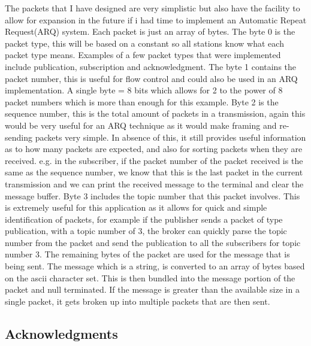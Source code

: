\documentclass{article}
\begin{document}
The packets that I have designed are very simplistic but also have the facility to allow for expansion in the future if i had time to implement an Automatic Repeat Request(ARQ) system.
Each packet is just an array of bytes. The byte 0 is the packet type, this will be based on a constant so all stations know what each packet type means. Examples of a few packet types that were implemented include publication, subscription and acknowledgment. 
\newline 
\newline
The byte 1 contains the packet number, this is useful for flow control and could also be used in an ARQ implementation. A single byte = 8 bits which allows for 2 to the power of 8 packet numbers which is more than enough for this example. 
\newline
\newline
Byte 2 is the sequence number, this is the total amount of packets in a transmission, again this would be very useful for an ARQ technique as it would make framing and re-sending packets very simple. In absence of this, it still provides useful information as to how many packets are expected, and also for sorting packets when they are received. e.g. in the subscriber, if the packet number of the packet received is the same as the sequence number, we know that this is the last packet in the current transmission and we can print the received message to the terminal and clear the message buffer. 
\newline
\newline
Byte 3 includes the topic number that this packet involves. This is extremely useful for this application as it allows for quick and simple identification of packets, for example if the publisher sends a packet of type publication, with a topic number of 3, the broker can quickly parse the topic number from the packet and send the publication to all the subscribers for topic number 3. 
\newline
\newline
The remaining bytes of the packet are used for the message that is being sent. The message which is a string, is converted to an array of bytes based on the ascii character set. This is then bundled into the message portion of the packet and null terminated. If the message is greater than the available size in a single packet, it gets broken up into multiple packets that are then sent.

\subsection{Acknowledgments}
\end{document}
